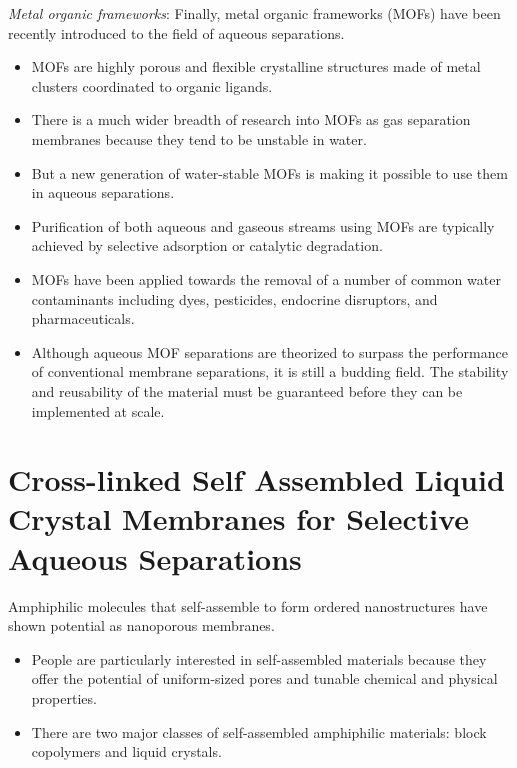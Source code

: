   \textit{Metal organic frameworks}: Finally, metal organic frameworks (MOFs) have been
  recently introduced to the field of aqueous separations.
  \begin{itemize}
    \item MOFs are highly porous and flexible crystalline structures made of metal
    clusters coordinated to organic ligands.~\cite{furukawa_chemistry_2013}
    \item There is a much wider breadth of research into MOFs as gas separation membranes
    because they tend to be unstable in water.~\cite{feng_construction_2013}
    \item But a new generation of water-stable MOFs is making it possible to use them
    in aqueous separations.~\cite{wang_ultrastable_2015}
    \item Purification of both aqueous and gaseous streams using MOFs are 
    typically achieved by selective adsorption or catalytic degradation.~\cite{li_metalorganic_2012}    
    \item MOFs have been applied towards the removal of a number of common water 
    contaminants including dyes, pesticides, endocrine disruptors, and pharmaceuticals.
    \cite{zhang_fabrication_2015,seo_adsorptive_2015,li_metalorganic_2015,hasan_adsorptive_2012}
    \item Although aqueous MOF separations are theorized to surpass the performance 
    of conventional membrane separations, it is still a budding field. The stability and
    reusability of the material must be guaranteed before they can be implemented
    at scale.~\cite{dias_towards_2015}
  \end{itemize}
  
  \section{Cross-linked Self Assembled Liquid Crystal Membranes for Selective Aqueous Separations}
  
  Amphiphilic molecules that self-assemble to form ordered nanostructures have shown
  potential as nanoporous membranes.
  \begin{itemize}
    \item People are particularly interested in self-assembled materials because they
    offer the potential of uniform-sized pores and tunable chemical and physical 
    properties.~\cite{werber_materials_2016}
    \item There are two major classes of self-assembled amphiphilic materials: block 
    copolymers and liquid crystals.
  \end{itemize}
  
